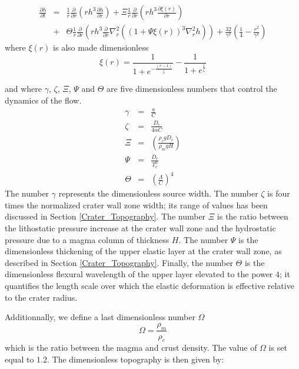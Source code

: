 \begin{article}
\begin{eqnarray}
  \frac{\partial h}{\partial t}&=&\frac{1}{r} \frac{\partial}{\partial r}\left (rh^{3} \frac{\partial h}{\partial r} \right)+ \Xi \frac{1}{r} \frac{\partial}{\partial r}\left ( rh^{3}\frac{\partial \xi(r)}{\partial r}\right )\nonumber\\
                               &+&\Theta \frac{1}{r}\frac{\partial}{\partial r}\left ( rh^{3} \frac{\partial}{\partial r} \nabla^{2}_{r}\left ((1+\Psi \xi(r))^{3}\nabla^{2}_{r}h \right )\right)+ \frac{32}{\gamma^{2}} \left(\frac{1}{4}-\frac{r^{2}}{\gamma^{2}}\right)
                                   \label{eq21}
\end{eqnarray}
where $\xi(r)$ is also made dimensionless
\begin{equation}
  \xi(r)=\frac{1}{1+e^{-\frac{(r-1)}{\zeta}}}-\frac{1}{1+e^{\frac{1}{\zeta}}}\label{eqqqq}
\end{equation}

and  where $\gamma$,  $\zeta$,  $\Xi$, $\Psi$  and  $\Theta$ are  five
dimensionless numbers that control the dynamics of the flow.
\begin{eqnarray}
  \label{Dimensionless1}
  \gamma&=&\frac{a}{C} \label{n1}\\
  \zeta&=&\frac{D_c}{4\alpha C}\label{n2}\\
  \Xi&=& \left(\frac{\rho_{c}gD_{c}}{\rho_{m}gH}\right )\label{n3}\\
  \Psi&=&\frac{D_{c}}{T_{e}^0}\label{n4}\\
  \Theta&=&\left ( \frac{\Lambda}{C} \right )^{4}\label{n5} 
\end{eqnarray}
The  number $\gamma$  represents the  dimensionless source  width. The
number $\zeta$  is four times  the normalized crater wall  zone width;
its    range   of    values    has   been    discussed   in    Section
\ref{Crater_Topography}.  The number  $\Xi$ is  the ratio  between the
lithostatic  pressure  increase  at  the  crater  wall  zone  and  the
hydrostatic  pressure due  to a  magma  column of  thickness $H$.  The
number $\Psi$  is the  dimensionless thickening  of the  upper elastic
layer   at   the  crater   wall   zone,   as  described   in   Section
\ref{Crater_Topography}.   Finally,  the   number   $\Theta$  is   the
dimensionless flexural wavelength  of the upper layer  elevated to the
power  $4$; it  quantifies the  length  scale over  which the  elastic
deformation is effective relative to the crater radius.
	
Additionnally, we define a last dimensionless number $\Omega$
\begin{equation}
  \Omega=\frac{\rho_m}{\rho_c}
\end{equation}
which is the  ratio between the magma and crust  density. The value of
$\Omega$ is set  equal to $1.2$. The dimensionless  topography is then
given by:
	

\end{article}
